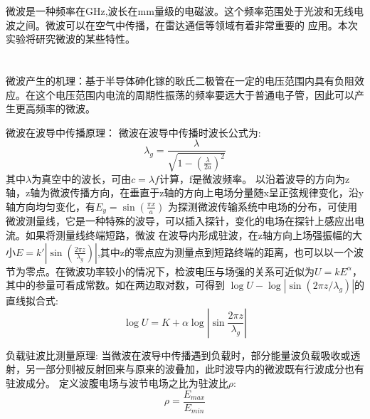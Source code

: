 ﻿\documentclass[10.5pt]{article}
\begin{document}
\title{\textbf{}} %
\author{}
\date{}
\maketitle
\section{\textbf{}}
微波是一种频率在GHz,波长在mm量级的电磁波。这个频率范围处于光波和无线电波之间。微波可以在空气中传播，在雷达通信等领域有着非常重要的
应用。本次实验将研究微波的某些特性。
\section{\textbf{}}

微波产生的机理：基于半导体砷化镓的耿氏二极管在一定的电压范围内具有负阻效应。在这个电压范围内电流的周期性振荡的频率要远大于普通电子管，因此可以产生更高频率的微波。

微波在波导中传播原理：
微波在波导中传播时波长公式为:
\begin{equation}
\lambda_g=\frac{\lambda}{\sqrt{1-(\frac{\lambda}{2a})^2}}
\end{equation}
其中$\lambda$为真空中的波长，可由$c=\lambda f$计算，f是微波频率。
以沿着波导的方向为z轴，z轴为微波传播方向，在垂直于z轴的方向上电场分量随x呈正弦规律变化，沿y轴方向均匀变化，有$E_y=\sin(\frac{\pi x}{a})$
为探测微波传输系统中电场的分布，可使用微波测量线，它是一种特殊的波导，可以插入探针，变化的电场在探针上感应出电流。如果将测量线终端短路，微波
在波导内形成驻波，在z轴方向上场强振幅的大小$E=k'|\sin(\frac{2\pi z}{\lambda_g})|$,其中z的零点应为测量点到短路终端的距离，也可以以一个波节为零点。在微波功率较小的情况下，检波电压与场强的关系可近似为$U=kE^{\alpha}$，其中的参量可看成常数。如在两边取对数，可得到
$\log U - \log |\sin(2 \pi z /\lambda_g)|$的直线拟合式:
\begin{equation}
\log U = K + \alpha \log |\sin \frac{2 \pi z}{\lambda_g}|
\end{equation}

负载驻波比测量原理:
当微波在波导中传播遇到负载时，部分能量波负载吸收或透射，另一部分则被反射回来与原来的波叠加，此时波导内的微波既有行波成分也有驻波成分。
定义波腹电场与波节电场之比为驻波比$\rho$:
\begin{equation}
\rho=\frac{E_{max}}{E_{min}}
\end{equation}
\end{document}
